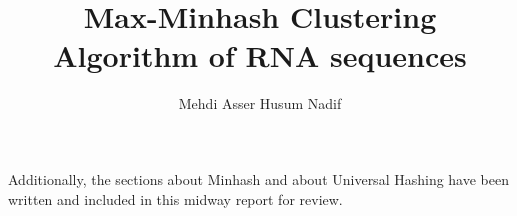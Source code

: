 \documentclass[10pt,a4paper]{article} %
\title{Max-Minhash Clustering Algorithm of RNA sequences}
\author{Mehdi Asser Husum Nadif}
\begin{document}
\maketitle
\newpage

\tableofcontents
\newpage

\newpage
Additionally, the sections about Minhash and about Universal Hashing have been written and included in this midway report for review.




\nocite{*}

{}


\end{document}
